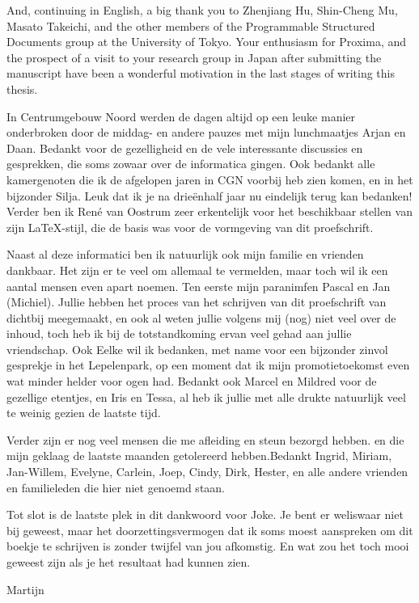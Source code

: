 And, continuing in English, a big thank you to Zhenjiang Hu, Shin-Cheng Mu, Masato Takeichi, and the other members of the Programmable Structured Documents group at the University of Tokyo. Your enthusiasm for Proxima, and the prospect of a visit to your research group in Japan after submitting the manuscript have been a wonderful motivation in the last stages of writing this thesis.


In Centrumgebouw Noord werden de dagen altijd op een leuke manier onderbroken door de middag- en andere pauzes met mijn lunchmaatjes Arjan en Daan. Bedankt voor de gezelligheid en de vele interessante discussies en gesprekken, die soms zowaar over de informatica gingen. Ook bedankt alle kamergenoten die ik de afgelopen jaren in CGN voorbij heb zien komen, en in het bijzonder Silja. Leuk dat ik je na drie\"enhalf jaar nu eindelijk terug kan bedanken! Verder ben ik Ren\'e van Oostrum zeer erkentelijk voor het beschikbaar stellen van zijn \LaTeX-stijl, die de basis was voor de vormgeving van dit proefschrift.

Naast al deze informatici ben ik natuurlijk ook mijn familie en vrienden dankbaar. Het zijn er te veel om allemaal te vermelden, maar toch wil ik een aantal mensen even apart noemen. Ten eerste mijn paranimfen Pascal en Jan (Michiel). Jullie hebben het proces van het schrijven van dit proefschrift van dichtbij meegemaakt, en ook al weten jullie volgens mij (nog) niet veel over de inhoud, toch heb ik bij de totstandkoming ervan veel gehad aan jullie vriendschap.  Ook Eelke wil ik bedanken, met name voor een bijzonder zinvol gesprekje in het Lepelenpark, op een moment dat ik mijn promotietoekomst even wat minder helder voor ogen had. Bedankt ook Marcel en Mildred voor de gezellige etentjes, en Iris en Tessa, al heb ik jullie met alle drukte natuurlijk veel te weinig gezien de laatste tijd.

Verder zijn er nog veel mensen die me afleiding en steun bezorgd hebben. \bc en die mijn geklaag de laatste maanden getolereerd hebben.\ec Bedankt Ingrid, Miriam, Jan-Willem, Evelyne, Carlein, Joep, Cindy, Dirk, Hester, en alle andere vrienden en familieleden die  hier niet genoemd staan. 





Tot slot is de laatste plek in dit dankwoord voor Joke. Je bent er weliswaar niet bij geweest, maar het doorzettingsvermogen dat ik soms moest aanspreken om dit boekje te schrijven is zonder twijfel van jou afkomstig. En wat zou het \bc toch \ec mooi geweest zijn als je het resultaat had kunnen zien.

\bigskip
Martijn
